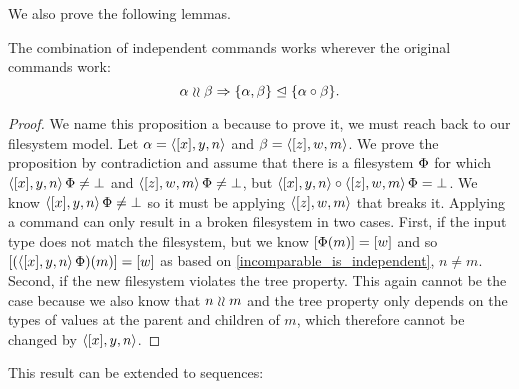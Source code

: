 We also prove the following lemmas.

\begin{myax}\label{combine_independent_commands}
The combination of independent commands works wherever the original commands work:
\[ \alpha\mathrel{\wr\wr} \beta \Rightarrow {\{\alpha, \beta\}}\trianglelefteq{\{\alpha\circ\beta\}}. \]
\end{myax}
\begin{proof}
We name this proposition a  
because to prove it, we must reach back to our filesystem model.
Let $\alpha=\langle{[x],y,n}\rangle$ and $\beta=\langle{[z],w,m}\rangle$.
We prove the proposition by contradiction and
assume that there is a filesystem $\Phi$ for which
$\langle{[x],y,n}\rangle\,\Phi\neq\bot$ and $\langle{[z],w,m}\rangle\,\Phi\neq\bot$, but
$\langle{[x],y,n}\rangle\circ \langle{[z],w,m}\rangle\,\Phi=\bot$.
We know $\langle{[x],y,n}\rangle\,\Phi\neq\bot$ so it must be applying 
$\langle{[z],w,m}\rangle$ that breaks it.
Applying a command can only result in a broken filesystem in two cases.
First, if the input type does not match the filesystem,
but we know $[\Phi(m)]=[w]$ and so
$[(\langle{[x],y,n}\rangle\,\Phi)(m)]=[w]$ as based on \cref{incomparable_is_independent}, $n\neq m$.
Second, if the new filesystem violates the tree property.
This again cannot be the case because we also know that $n\mathrel{\wr\wr} m$
and the tree property only depends on the types of values at the parent and children of $m$,
which therefore cannot be changed by $\langle{[x],y,n}\rangle$.
\end{proof}

This result can be extended to sequences:

